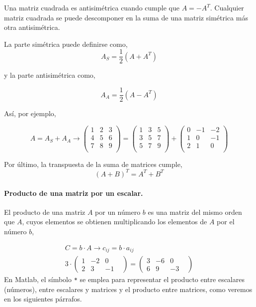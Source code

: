 Una matriz cuadrada es antisimétrica cuando cumple que $A=-A^T$. Cualquier matriz cuadrada se puede descomponer en la suma de una matriz simétrica más otra antisimétrica.

La parte simétrica puede definirse como,
\begin{equation*}
A_S=\frac{1}{2} \left( A+A^T \right)
\end{equation*}

y la parte antisimétrica como,

\begin{equation*}
A_A=\frac{1}{2}\left( A-A^T \right)
\end{equation*}

Así, por ejemplo,

\begin{equation*}
 A=A_S+A_A \rightarrow
\begin{pmatrix}
1& 2& 3\\
4& 5& 6\\
7& 8& 9\\
\end{pmatrix} =
\begin{pmatrix}
1& 3& 5\\
3& 5& 7\\
5& 7& 9\\
\end{pmatrix} +
\begin{pmatrix}
0& -1& -2\\
1& 0& -1\\
2& 1& 0\\
\end{pmatrix}
\end{equation*}

Por último, la transpuesta de la suma de matrices cumple,
\begin{equation*}
(A+B)^T=A^T+B^T
\end{equation*}


\paragraph{Producto de una matriz por un escalar.} El producto de una matriz $A$ por un número $b$ es una matriz del mismo orden que $A$, cuyos elementos se obtienen multiplicando los elementos de $A$ por el número $b$,

\begin{gather*}
C=b\cdot A \rightarrow c_{ij}=b\cdot a_{ij}\\
3\cdot
\begin{pmatrix}
1& -2& 0\\
2& 3& -1&
\end{pmatrix}=
\begin{pmatrix}
3& -6& 0\\
6& 9& -3&
\end{pmatrix} 
\end{gather*}
En Matlab, el símbolo \texttt{*} se emplea para representar el producto entre escalares (números), entre escalares y matrices y el producto entre matrices, como veremos en los siguientes párrafos.

